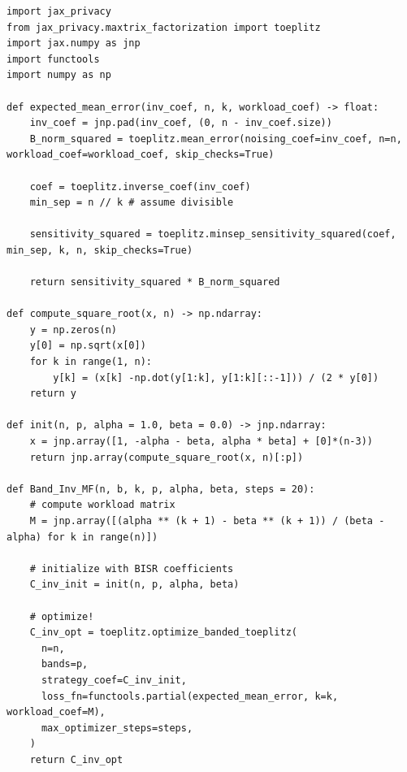 \documentclass{article} %
\begin{document}
\begin{lstlisting}[label={lst:bandinv_code}]
import jax_privacy
from jax_privacy.maxtrix_factorization import toeplitz
import jax.numpy as jnp
import functools
import numpy as np

def expected_mean_error(inv_coef, n, k, workload_coef) -> float:
    inv_coef = jnp.pad(inv_coef, (0, n - inv_coef.size))
    B_norm_squared = toeplitz.mean_error(noising_coef=inv_coef, n=n,  workload_coef=workload_coef, skip_checks=True)
    
    coef = toeplitz.inverse_coef(inv_coef)
    min_sep = n // k # assume divisible

    sensitivity_squared = toeplitz.minsep_sensitivity_squared(coef, min_sep, k, n, skip_checks=True)

    return sensitivity_squared * B_norm_squared

def compute_square_root(x, n) -> np.ndarray:
    y = np.zeros(n)
    y[0] = np.sqrt(x[0])
    for k in range(1, n):
        y[k] = (x[k] -np.dot(y[1:k], y[1:k][::-1])) / (2 * y[0])
    return y

def init(n, p, alpha = 1.0, beta = 0.0) -> jnp.ndarray:
    x = jnp.array([1, -alpha - beta, alpha * beta] + [0]*(n-3))
    return jnp.array(compute_square_root(x, n)[:p])

def Band_Inv_MF(n, b, k, p, alpha, beta, steps = 20):
    # compute workload matrix
    M = jnp.array([(alpha ** (k + 1) - beta ** (k + 1)) / (beta - alpha) for k in range(n)])
    
    # initialize with BISR coefficients
    C_inv_init = init(n, p, alpha, beta)
    
    # optimize!
    C_inv_opt = toeplitz.optimize_banded_toeplitz(
      n=n,
      bands=p,
      strategy_coef=C_inv_init,
      loss_fn=functools.partial(expected_mean_error, k=k, workload_coef=M),
      max_optimizer_steps=steps,
    )
    return C_inv_opt
\end{lstlisting}


\clearpage
\end{document}
